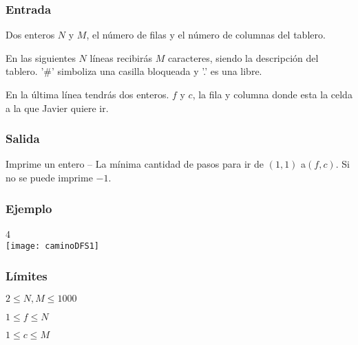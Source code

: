 \subsubsection*{Entrada}
Dos enteros \(N\) y \(M\), el número de filas y el número de columnas del tablero.

En las siguientes \(N\) líneas recibirás \(M\) caracteres, siendo la descripción del tablero. '\#' simboliza una casilla bloqueada y '.' es una libre.

En la última línea tendrás dos enteros. \(f\) y \(c\), la fila y columna donde esta la celda a la que Javier quiere ir.

\subsubsection*{Salida}
Imprime un entero -- La mínima cantidad de pasos para ir de \((1, 1)\) a\((f, c)\). Si no se puede imprime \(-1\).

\subsubsection*{Ejemplo}

\begin{casebox3}
	 {		
		4
	}{
		\\
		\texttt{[image: caminoDFS1]}
	}
\end{casebox3}

\subsubsection*{Límites}
\begin{plimits}
	\item \(2\leq N, M\leq 1000\)
	\item \(1\leq f \leq N\)
	\item \(1\leq c \leq M\)
\end{plimits}

